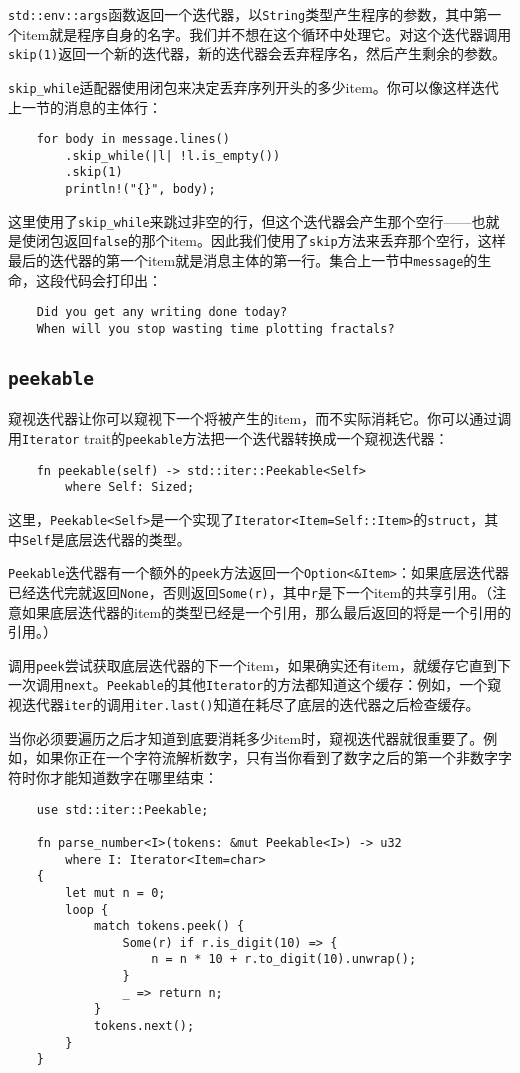 \texttt{std::env::args}函数返回一个迭代器，以\texttt{String}类型产生程序的参数，其中第一个item就是程序自身的名字。我们并不想在这个循环中处理它。对这个迭代器调用\texttt{skip(1)}返回一个新的迭代器，新的迭代器会丢弃程序名，然后产生剩余的参数。

\texttt{skip\_while}适配器使用闭包来决定丢弃序列开头的多少item。你可以像这样迭代上一节的消息的主体行：
\begin{verbatim}
    for body in message.lines()
        .skip_while(|l| !l.is_empty())
        .skip(1)
        println!("{}", body);
\end{verbatim}

这里使用了\texttt{skip\_while}来跳过非空的行，但这个迭代器会产生那个空行——也就是使闭包返回\texttt{false}的那个item。因此我们使用了\texttt{skip}方法来丢弃那个空行，这样最后的迭代器的第一个item就是消息主体的第一行。集合上一节中\texttt{message}的生命，这段代码会打印出：
\begin{verbatim}
    Did you get any writing done today?
    When will you stop wasting time plotting fractals?
\end{verbatim}

\subsection{\texttt{peekable}}
窥视迭代器让你可以窥视下一个将被产生的item，而不实际消耗它。你可以通过调用\texttt{Iterator} trait的\texttt{peekable}方法把一个迭代器转换成一个窥视迭代器：
\begin{verbatim}
    fn peekable(self) -> std::iter::Peekable<Self>
        where Self: Sized;
\end{verbatim}
这里，\texttt{Peekable<Self>}是一个实现了\texttt{Iterator<Item=Self::Item>}的\texttt{struct}，其中\texttt{Self}是底层迭代器的类型。

\texttt{Peekable}迭代器有一个额外的\texttt{peek}方法返回一个\texttt{Option<\&Item>}：如果底层迭代器已经迭代完就返回\texttt{None}，否则返回\texttt{Some(r)}，其中\texttt{r}是下一个item的共享引用。（注意如果底层迭代器的item的类型已经是一个引用，那么最后返回的将是一个引用的引用。）

调用\texttt{peek}尝试获取底层迭代器的下一个item，如果确实还有item，就缓存它直到下一次调用\texttt{next}。\texttt{Peekable}的其他\texttt{Iterator}的方法都知道这个缓存：例如，一个窥视迭代器\texttt{iter}的调用\texttt{iter.last()}知道在耗尽了底层的迭代器之后检查缓存。

当你必须要遍历之后才知道到底要消耗多少item时，窥视迭代器就很重要了。例如，如果你正在一个字符流解析数字，只有当你看到了数字之后的第一个非数字字符时你才能知道数字在哪里结束：
\begin{verbatim}
    use std::iter::Peekable;

    fn parse_number<I>(tokens: &mut Peekable<I>) -> u32
        where I: Iterator<Item=char>
    {
        let mut n = 0;
        loop {
            match tokens.peek() {
                Some(r) if r.is_digit(10) => {
                    n = n * 10 + r.to_digit(10).unwrap();
                }
                _ => return n;
            }
            tokens.next();
        }
    }
\end{verbatim}

